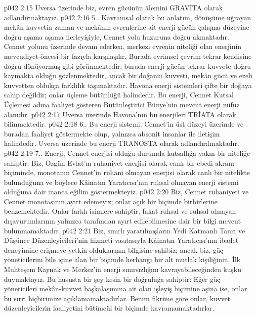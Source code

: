 \vs p042 2:15 Uversa üzerinde biz, evren gücünün âlemini GRAVİTA olarak adlandırmaktayız.
\vs p042 2:16 5.. Kavramsal olarak bu anlatım, dönüşüme uğrayan mekân\hyp{}kuvvetin zaman ve mekânın evrenlerine ait enerji\hyp{}gücün çalışma düzeyine doğru aşama aşama ilerleyişiyle, Cennet yolu huzuruna doğru akmaktadır. Cennet yolunu üzerinde devam ederken, merkezi evrenin niteliği olan enerjinin mevcudiyet\hyp{}öncesi bir fazıyla karşılaşılır. Burada evrimsel çevrim tekrar kendisine doğru dönüyormuş gibi görünmektedir; burada enerji\hyp{}gücün tekrar kuvvete doğru kaymakta olduğu gözlenmektedir, ancak bir doğanın kuvveti, mekân gücü ve ezeli kuvvetten oldukça farklılık taşımaktadır. Havona enerji sistemleri çifte bir doğaya sahip değildir; onlar üçleme bütünlüğü halindedir. Bu enerji, Cennet Kutsal Üçlemesi adına faaliyet gösteren Bütünleştirici Bünye’nin mevcut enerji nüfuz alanıdır.
\vs p042 2:17 Uversa üzerinde Havona’nın bu enerjileri TRİATA olarak bilinmektedir.
\vs p042 2:18 6.\bibnobreakspace {}. Bu enerji sistemi; Cennet’in üst düzeyi üzerinde ve buradan faaliyet göstermekte olup, yalnızca absonit insanlar ile iletişim halindedir. Uversa üzerinde bu enerji TRANOSTA olarak adlandırılmaktadır.
\vs p042 2:19 7.\bibnobreakspace {}. Enerji, Cennet enerjisi olduğu durumda kutsallığa yakın bir niteliğe sahiptir. Biz, Özgün Evlat’ın ruhaniyet enerjisi olarak canlı bir ebedi akranı biçiminde, monotanın Cennet’in ruhani olmayan enerjisi olarak canlı bir nitelikte bulunduğuna ve böylece Kâinatın Yaratıcısı’nın ruhsal olmayan enerji sistemi olduğuna dair inanca eğilim göstermekteyiz.
\vs p042 2:20 Biz, Cennet ruhaniyeti ve Cennet monotasının  ayırt edemeyiz; onlar açık bir biçimde birbirlerine benzemektedir. Onlar farklı isimlere sahiptir, fakat ruhsal ve ruhsal olmayan dışavurumlarının yalnızca  tarafından ayırt edilebilmesine dair bir bilgi mevcut bulunmamaktadır.
\vs p042 2:21 Biz, sınırlı yaratılmışların Yedi Katmanlı Tanrı ve Düşünce Düzenleyicileri’nin hizmeti vasıtasıyla Kâinatın Yaratıcısı’nın ibadet deneyimine erişmeye yetkin olduklarının bilgisine sahibiz; ancak biz, güç yöneticilerini bile içine alan bir biçimde herhangi bir alt mutlak kişiliğinin, İlk Muhteşem Kaynak ve Merkez’in enerji sınırsızlığını kavrayabileceğinden kuşku duymaktayız. Bu hususta bir şey kesin bir doğruluğa sahiptir: Eğer güç yöneticileri mekân\hyp{}kuvvet başkalaşımına ait olan işleyiş biçimine aşina ise, onlar bu sırrı hiçbirimize açıklamamaktadırlar. Benim fikrime göre onlar, kuvvet düzenleyicilerin faaliyetini bütüncül bir biçimde kavramamaktadırlar.
